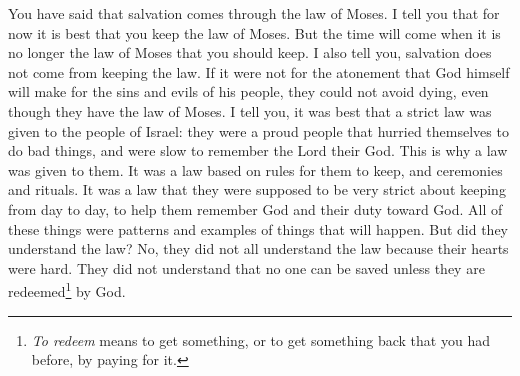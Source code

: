\bverse \iffalse And now ye have said that salvation cometh by the law of Moses. I say unto you that it is expedient that ye should keep the law of Moses as yet; but I say unto you, that the time shall come when it shall no more be expedient to keep the law of Moses. \fi
You have said that salvation comes through the law of Moses. I tell you that for now it is best that you keep the law of Moses. But the time will come when it is no longer the law of Moses that you should keep.
\bverse \iffalse And moreover, I say unto you, that salvation doth not come by the law alone; and were it not for the atonement, which God himself shall make for the sins and iniquities of his people, that they must unavoidably perish, notwithstanding the law of Moses. \fi
I also tell you, salvation does not come from keeping the law. If it were not for the atonement that God himself will make for the sins and evils of his people, they could not avoid dying, even though they have the law of Moses.
\bverse \iffalse And now I say unto you that it was expedient that there should be a law given to the children of Israel, yea, even a very strict law; for they were a stiffnecked people, quick to do iniquity, and slow to remember the Lord their God; \fi
I tell you, it was best that a strict law was given to the people of Israel: they were a proud people that hurried themselves to do bad things, and were slow to remember the Lord their God.
\bverse \iffalse Therefore there was a law given them, yea, a law of performances and of ordinances, a law which they were to observe strictly from day to day, to keep them in remembrance of God and their duty towards him. \fi
This is why a law was given to them. It was a law based on rules for them to keep, and ceremonies and rituals. It was a law that they were supposed to be very strict about keeping from day to day, to help them remember God and their duty toward God.
\bverse \iffalse But behold, I say unto you, that all these things were types of things to come. \fi
All of these things were patterns and examples of things that will happen.
\bverse \iffalse And now, did they understand the law? I say unto you, Nay, they did not all understand the law; and this because of the hardness of their hearts; for they understood not that there could not any man be saved except it were through the redemption of God. \fi
But did they understand the law? No, they did not all understand the law because their hearts were hard. They did not understand that no one can be saved unless they are redeemed\footnote{\textit{To redeem} means to get something, or to get something back that you had before, by paying for it.} by God.
